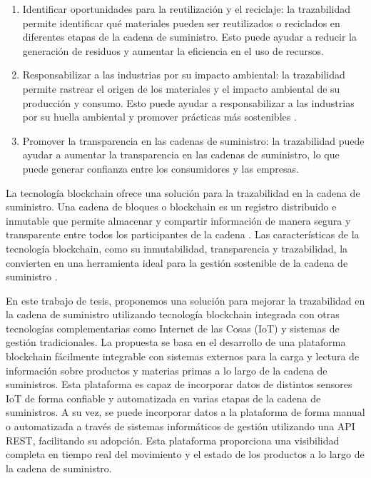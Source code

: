 \documentclass{article}
\begin{document}
\begin{enumerate}
	\item Identificar oportunidades para la reutilización y el reciclaje: la trazabilidad permite identificar qué materiales pueden ser reutilizados o reciclados en diferentes etapas de la cadena de suministro. Esto puede ayudar a reducir la generación de residuos y aumentar la eficiencia en el uso de recursos.

	\item Responsabilizar a las industrias por su impacto ambiental: la trazabilidad permite rastrear el origen de los materiales y el impacto ambiental de su producción y consumo. Esto puede ayudar a responsabilizar a las industrias por su huella ambiental y promover prácticas más sostenibles \cite{melendez2021economia}.

	\item Promover la transparencia en las cadenas de suministro: la trazabilidad puede ayudar a aumentar la transparencia en las cadenas de suministro, lo que puede generar confianza entre los consumidores y las empresas.
\end{enumerate}

La tecnología blockchain ofrece una solución para la trazabilidad en la cadena de suministro. Una cadena de bloques o blockchain es un registro distribuido e inmutable que permite almacenar y compartir información de manera segura y transparente entre todos los participantes de la cadena \cite{rennock2018blockchain}. Las características de la tecnología blockchain, como su inmutabilidad, transparencia y trazabilidad, la convierten en una herramienta ideal para la gestión sostenible de la cadena de suministro \cite{baralla2023waste, bulkowska2023implementation, alnuaimi2023blockchain}.

En este trabajo de tesis, proponemos una solución para mejorar la trazabilidad en la cadena de suministro utilizando tecnología blockchain integrada con otras tecnologías complementarias como Internet de las Cosas (IoT) y sistemas de gestión tradicionales. La propuesta se basa en el desarrollo de una plataforma blockchain fácilmente integrable con sistemas externos para la carga y lectura de información sobre productos y materias primas a lo largo de la cadena de suministros. Esta plataforma es capaz de incorporar datos de distintos sensores IoT de forma confiable y automatizada en varias etapas de la cadena de suministros. A su vez, se puede incorporar datos a la plataforma de forma manual o automatizada a través de sistemas informáticos de gestión utilizando una API REST, facilitando su adopción. Esta plataforma proporciona una visibilidad completa en tiempo real del movimiento y el estado de los productos a lo largo de la cadena de suministro.
\end{document}
